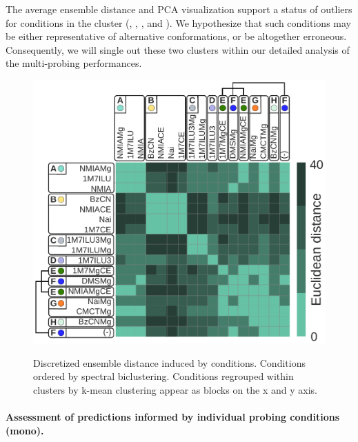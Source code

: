 \documentclass[a4,center,fleqn]{NAR}
\begin{document}
The average ensemble distance and PCA visualization support a status of outliers for conditions in the cluster  (\OneMSevCE, \NMIACE, \BzCN, and \NAICE).  We hypothesize that such conditions may be either representative of alternative conformations, or be altogether erroneous. Consequently, we will single out these two clusters within our detailed analysis of the multi-probing performances.








\begin{figure}
	{\centering \includegraphics[width=\linewidth]{graphs/didy/bi_clustering}\\}%
	
	\caption{Discretized ensemble distance induced by conditions. Conditions ordered by spectral biclustering. Conditions regrouped within clusters by k-mean clustering appear as blocks on the x and y axis.}\label{fig:biclustering}
\end{figure}







\paragraph{Assessment of predictions informed by individual probing conditions (mono).}
\end{document}

